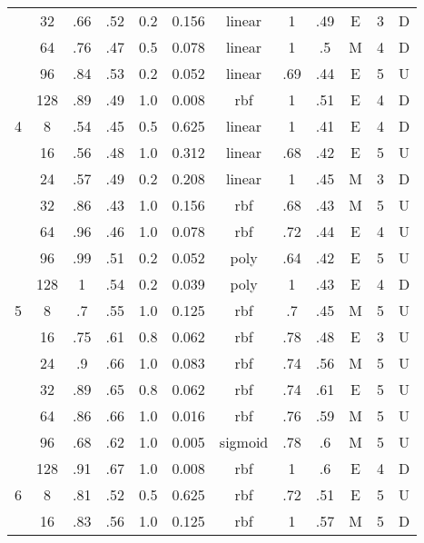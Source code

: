 \begin{table}
\begin{tabular}{|c|c|ccccc||ccccc|}
  &  32 &   .66 &  .52 & 0.2 &    0.156 &  linear &     1 &  .49 &      E & 3 &       D \\
  &  64 &   .76 &  .47 & 0.5 &    0.078 &  linear &     1 &   .5 &      M & 4 &       D \\
  &  96 &   .84 &  .53 & 0.2 &    0.052 &  linear &   .69 &  .44 &      E & 5 &       U \\
  & 128 &   .89 &  .49 & 1.0 &    0.008 &     rbf &     1 &  .51 &      E & 4 &       D \\\hline
4 &   8 &   .54 &  .45 & 0.5 &    0.625 &  linear &     1 &  .41 &      E & 4 &       D \\
  &  16 &   .56 &  .48 & 1.0 &    0.312 &  linear &   .68 &  .42 &      E & 5 &       U \\
  &  24 &   .57 &  .49 & 0.2 &    0.208 &  linear &     1 &  .45 &      M & 3 &       D \\
  &  32 &   .86 &  .43 & 1.0 &    0.156 &     rbf &   .68 &  .43 &      M & 5 &       U \\
  &  64 &   .96 &  .46 & 1.0 &    0.078 &     rbf &   .72 &  .44 &      E & 4 &       U \\
  &  96 &   .99 &  .51 & 0.2 &    0.052 &    poly &   .64 &  .42 &      E & 5 &       U \\
  & 128 &     1 &  .54 & 0.2 &    0.039 &    poly &     1 &  .43 &      E & 4 &       D \\\hline
5 &   8 &    .7 &  .55 & 1.0 &    0.125 &     rbf &    .7 &  .45 &      M & 5 &       U \\
  &  16 &   .75 &  .61 & 0.8 &    0.062 &     rbf &   .78 &  .48 &      E & 3 &       U \\
  &  24 &    .9 &  .66 & 1.0 &    0.083 &     rbf &   .74 &  .56 &      M & 5 &       U \\
  &  32 &   .89 &  .65 & 0.8 &    0.062 &     rbf &   .74 &  .61 &      E & 5 &       U \\
  &  64 &   .86 &  .66 & 1.0 &    0.016 &     rbf &   .76 &  .59 &      M & 5 &       U \\
  &  96 &   .68 &  .62 & 1.0 &    0.005 & sigmoid &   .78 &   .6 &      M & 5 &       U \\
  & 128 &   .91 &  .67 & 1.0 &    0.008 &     rbf &     1 &   .6 &      E & 4 &       D \\\hline
6 &   8 &   .81 &  .52 & 0.5 &    0.625 &     rbf &   .72 &  .51 &      E & 5 &       U \\
  &  16 &   .83 &  .56 & 1.0 &    0.125 &     rbf &     1 &  .57 &      M & 5 &       D \\

\end{tabular}
\end{table}
